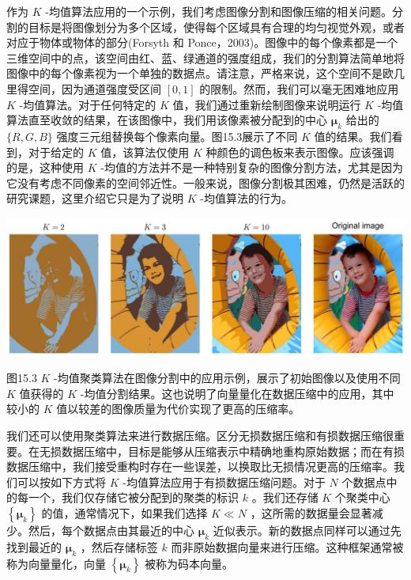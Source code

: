 \documentclass[10pt]{report}
\begin{document}
作为 \(K\) -均值算法应用的一个示例，我们考虑图像分割和图像压缩的相关问题。分割的目标是将图像划分为多个区域，使得每个区域具有合理的均匀视觉外观，或者对应于物体或物体的部分(Forsyth 和 Ponce，2003)。图像中的每个像素都是一个三维空间中的点，该空间由红、蓝、绿通道的强度组成，我们的分割算法简单地将图像中的每个像素视为一个单独的数据点。请注意，严格来说，这个空间不是欧几里得空间，因为通道强度受区间 \(\left\lbrack  {0,1}\right\rbrack\) 的限制。然而，我们可以毫无困难地应用 \(K\) -均值算法。对于任何特定的 \(K\) 值，我们通过重新绘制图像来说明运行 \(K\) -均值算法直至收敛的结果，在该图像中，我们用该像素被分配到的中心 \({\mathbf{\mu }}_{k}\) 给出的 \(\{ R,G,B\}\) 强度三元组替换每个像素向量。图15.3展示了不同 \(K\) 值的结果。我们看到，对于给定的 \(K\) 值，该算法仅使用 \(K\) 种颜色的调色板来表示图像。应该强调的是，这种使用 \(K\) -均值的方法并不是一种特别复杂的图像分割方法，尤其是因为它没有考虑不同像素的空间邻近性。一般来说，图像分割极其困难，仍然是活跃的研究课题，这里介绍它只是为了说明 \(K\) -均值算法的行为。

\begin{center}
\includegraphics[max width=1.0\textwidth]{images/0194e279-9b28-703a-88f4-c3ac21e2010d_484_202_342_1346_467_0.jpg}
\end{center}
\hspace*{3em} 

图15.3 \(K\) -均值聚类算法在图像分割中的应用示例，展示了初始图像以及使用不同 \(K\) 值获得的 \(K\) -均值分割结果。这也说明了向量量化在数据压缩中的应用，其中较小的 \(K\) 值以较差的图像质量为代价实现了更高的压缩率。

我们还可以使用聚类算法来进行数据压缩。区分无损数据压缩和有损数据压缩很重要。在无损数据压缩中，目标是能够从压缩表示中精确地重构原始数据；而在有损数据压缩中，我们接受重构时存在一些误差，以换取比无损情况更高的压缩率。我们可以按如下方式将 \(K\) -均值算法应用于有损数据压缩问题。对于 \(N\) 个数据点中的每一个，我们仅存储它被分配到的聚类的标识 \(k\) 。我们还存储 \(K\) 个聚类中心 \(\left\{  {\mathbf{\mu }}_{k}\right\}\) 的值，通常情况下，如果我们选择 \(K \ll  N\) ，这所需的数据量会显著减少。然后，每个数据点由其最近的中心 \({\mathbf{\mu }}_{k}\) 近似表示。新的数据点同样可以通过先找到最近的 \({\mathbf{\mu }}_{k}\) ，然后存储标签 \(k\) 而非原始数据向量来进行压缩。这种框架通常被称为向量量化，向量 \(\left\{  {\mathbf{\mu }}_{k}\right\}\) 被称为码本向量。
\end{document}
